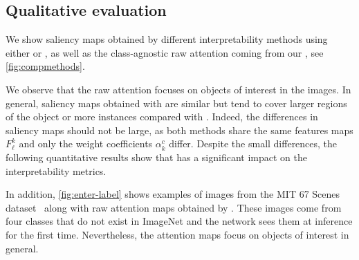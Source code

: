 
\subsection{Qualitative evaluation}
\label{subsec:vinspection}

We show saliency maps obtained by different interpretability methods using either \gap or \Ours, as well as the class-agnostic raw attention coming from our \Ours, see \autoref{fig:compmethods}.

We observe that the raw attention focuses on objects of interest in the images. 
In general, saliency maps obtained with \Ours are similar but tend to cover larger regions of the object or more instances compared with \gap.%
%
Indeed, the differences in saliency maps should not be large, as both methods share the same features maps $F^k_\ell$ and only the weight coefficients $\alpha^c_k$ differ.
Despite the small differences, the following quantitative results show that \Ours has a significant impact on the interpretability metrics.

%





In addition, \autoref{fig:enter-label} shows examples of images from the MIT 67 Scenes dataset~\cite{quattoni2009recognizing} along with raw attention maps obtained by \Ours. These images come from four classes that do not exist in ImageNet and the network sees them at inference for the first time. Nevertheless, the attention maps focus on objects of interest in general.
